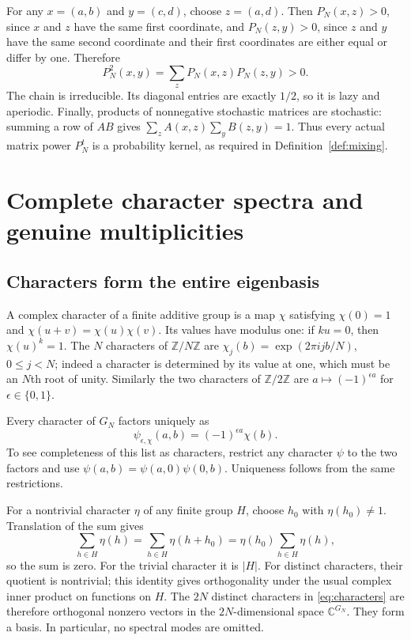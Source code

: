 \documentclass[11pt,a4paper]{article}
\theoremstyle{definition}
\theoremstyle{remark}
\newcommand{\C}{\mathbb C}
\newcommand{\Z}{\mathbb Z}
\begin{document}
For any $x=(a,b)$ and $y=(c,d)$, choose $z=(a,d)$. Then
$P_N(x,z)>0$, since $x$ and $z$ have the same first coordinate, and
$P_N(z,y)>0$, since $z$ and $y$ have the same second coordinate and their
first coordinates are either equal or differ by one. Therefore
\[
P_N^2(x,y)=\sum_zP_N(x,z)P_N(z,y)>0.
\]
The chain is irreducible. Its diagonal entries are exactly $1/2$, so it is
lazy and aperiodic. Finally, products of nonnegative stochastic matrices
are stochastic: summing a row of $AB$ gives
$\sum_z A(x,z)\sum_yB(z,y)=1$. Thus every actual matrix power $P_N^t$ is a
probability kernel, as required in Definition~\ref{def:mixing}.

\section{Complete character spectra and genuine multiplicities}

\subsection{Characters form the entire eigenbasis}

A complex character of a finite additive group is a map $\chi$ satisfying
$\chi(0)=1$ and $\chi(u+v)=\chi(u)\chi(v)$. Its values have modulus one:
if $ku=0$, then $\chi(u)^k=1$.
The $N$ characters of $\Z/N\Z$ are
$\chi_j(b)=\exp(2\pi i jb/N)$, $0\le j<N$; indeed a character is determined
by its value at one, which must be an $N$th root of unity. Similarly the two
characters of $\Z/2\Z$ are $a\mapsto(-1)^{\epsilon a}$ for
$\epsilon\in\{0,1\}$.

Every character of $G_N$ factors uniquely as
\begin{equation}\label{eq:characters}
\psi_{\epsilon,\chi}(a,b)=(-1)^{\epsilon a}\chi(b).
\end{equation}
To see completeness of this list as characters, restrict any character
$\psi$ to the two factors and use
$\psi(a,b)=\psi(a,0)\psi(0,b)$. Uniqueness follows from the same restrictions.

For a nontrivial character $\eta$ of any finite group $H$, choose $h_0$
with $\eta(h_0)\ne1$. Translation of the sum gives
\[
\sum_{h\in H}\eta(h)=\sum_{h\in H}\eta(h+h_0)
=\eta(h_0)\sum_{h\in H}\eta(h),
\]
so the sum is zero. For the trivial character it is $|H|$.
For distinct characters, their quotient is nontrivial; this identity gives
orthogonality under the usual complex inner product on functions on $H$.
The $2N$ distinct characters in \eqref{eq:characters} are therefore
orthogonal nonzero vectors in the $2N$-dimensional space $\C^{G_N}$.
They form a basis. In particular, no spectral modes are omitted.
\end{document}
